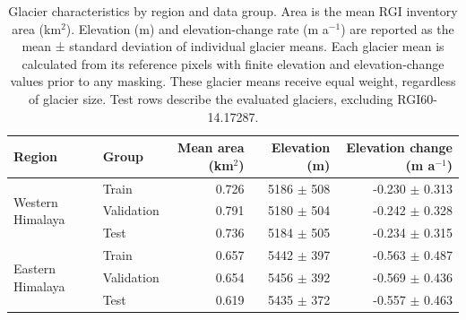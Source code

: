 \begin{table}[!htbp]\centering\small
\caption{Glacier characteristics by region and data group. Area is the mean RGI inventory area (km$^2$). Elevation (m) and elevation-change rate (m a$^{-1}$) are reported as the mean ± standard deviation of individual glacier means. Each glacier mean is calculated from its reference pixels with finite elevation and elevation-change values prior to any masking. These glacier means receive equal weight, regardless of glacier size. Test rows describe the evaluated glaciers, excluding RGI60-14.17287.}\label{tab:metadata}
\begin{tabular}{llrrr}\toprule Region & Group & Mean area (km$^2$) & Elevation (m) & Elevation change (m a$^{-1}$)\\\midrule
 \multirow{3}{*}{Western Himalaya} & Train & 0.726 & 5186 $\pm$ 508 & -0.230 $\pm$ 0.313 \\
 & Validation & 0.791 & 5180 $\pm$ 504 & -0.242 $\pm$ 0.328 \\
 & Test & 0.736 & 5184 $\pm$ 505 & -0.234 $\pm$ 0.315 \\
 \midrule
\multirow{3}{*}{Eastern Himalaya}  & Train & 0.657 & 5442 $\pm$ 397 & -0.563 $\pm$ 0.487 \\
 & Validation & 0.654 & 5456 $\pm$ 392 & -0.569 $\pm$ 0.436 \\
 & Test & 0.619 & 5435 $\pm$ 372 & -0.557 $\pm$ 0.463 \\
 \bottomrule\end{tabular}\end{table}
